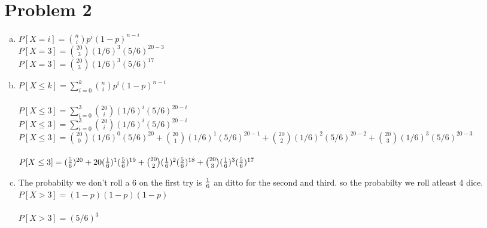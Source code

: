 \documentclass[11pt,letterpaper]{article}
\begin{document}
\section*{Problem 2}
\begin{enumerate}[(a)]
\item
$P[X=i]= {n\choose i}p^i(1-p)^{n-i}$ \\
$P[X=3]= {20\choose 3}(1/6)^{3}(5/6)^{20-3}$ \\
$P[X=3]= {20\choose 3}(1/6)^{3}(5/6)^{17}$ 
\item
$P[X\leq k]= \sum\limits^{k}_{i=0} {n\choose i} p^i(1-p)^{n-i}$ \\\\
$P[X\leq 3]= \sum\limits^{3}_{i=0} {20\choose i} (1/6)^i(5/6)^{20-i}$ \\
$P[X\leq 3]= \sum\limits^{3}_{i=0} {20\choose i} (1/6)^i(5/6)^{20-i}$ \\
$P[X\leq 3]= {20\choose 0} (1/6)^0(5/6)^{20} + {20\choose 1} (1/6)^1(5/6)^{20-1} + {20\choose 2} (1/6)^2(5/6)^{20-2} + {20\choose 3} (1/6)^3(5/6)^{20-3}$ \\\\
$P[X\leq 3]= ({5\over6})^{20} + 20({1\over6})^1({5\over6})^{19} + {20\choose 2} ({1\over6})^2({5\over6})^{18} + {20\choose 3} ({1\over6})^3({5\over6})^{17}$ \\
\item
The probabilty we don't roll a 6 on the first try is ${1\over 6}$ an ditto for the second and third. so the probabilty we roll atleast 4 dice.\\
$P[X > 3]= (1-p)(1-p)(1-p)$\\\\
$P[X > 3]= (5/6)^3$\\\\


\end{enumerate}
\clearpage
\end{document}
